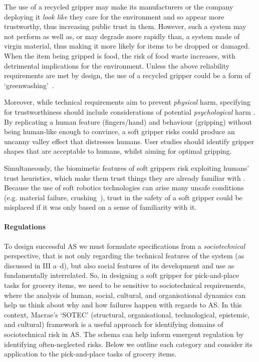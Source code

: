 \documentclass[letterpaper, 10 pt, conference]{ieeeconf}  %
\begin{document}
	The use of a recycled gripper may make its manufacturers or the company deploying it \emph{look like} they care for the environment and so appear more trustworthy, thus increasing public trust in them. However, such a system may not perform as well as, or may degrade more rapidly than, a system made of virgin material, thus making it more likely for items to be dropped or damaged. When the item being gripped is food, the risk of food waste increases, with detrimental implications for the environment. Unless the above reliability requirements are met by design, the use of a recycled gripper could be a form of `greenwashing'~\cite{delmas2011drivers}.    
	
	Moreover, while technical requirements aim to prevent \emph{physical} harm, specifying for trustworthiness should include considerations of potential \emph{psychological} harm \cite{Porter2023}. By replicating a human feature (fingers/hand) and behaviour (gripping) without being human-like enough to convince, a soft gripper risks could produce an uncanny valley effect \cite{moore2012bayesian} that distresses humans. User studies should identify gripper shapes that are acceptable to humans, whilst aiming for optimal gripping.  
	
	Simultaneously, the biomimetic features of soft grippers risk exploiting humans' trust heuristics, which make them trust things they are already familiar with \cite{Manzini}. Because the use of soft robotics technologies can arise many unsafe conditions (e.g. material failure, crushing~\cite{abidi2017intrinsic}), trust in the safety of a soft gripper could be misplaced if it was only based on a sense of familiarity with it.
	
	\paragraph{\textbf{Regulations}}\label{regulation}
	To design successful AS we must formulate specifications from a \emph{sociotechnical} perspective, that is not only regarding the technical features of the system (as discussed in III a--d), but also social features of its development and use as fundamentally interrelated. So, in designing a soft gripper for pick-and-place tasks for grocery items, we need to be sensitive to sociotechnical requirements, where the analysis of human, social, cultural, and organisational dynamics can help us think about why and how failures happen with regards to AS. In this context, Macrae's \cite{Macrae2022} `SOTEC' (structural, organisational, technological, epistemic, and cultural) framework is a useful approach for identifying domains of sociotechnical risk in AS. The schema can help inform emergent regulation by identifying often-neglected risks. Below we outline each category and consider its application to the pick-and-place tasks of grocery items.
	
\end{document}
